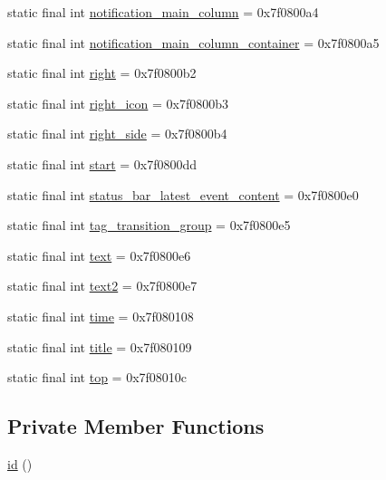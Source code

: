 \begin{DoxyCompactItemize}
static final int \mbox{\hyperlink{classcom_1_1jjoe64_1_1graphview_1_1_r_1_1id_a72bedca8ca6563404af280e15fcbd2ea}{notification\+\_\+main\+\_\+column}} = 0x7f0800a4
\item 
static final int \mbox{\hyperlink{classcom_1_1jjoe64_1_1graphview_1_1_r_1_1id_a2ddc64536454c41b6ff689ad255afba2}{notification\+\_\+main\+\_\+column\+\_\+container}} = 0x7f0800a5
\item 
static final int \mbox{\hyperlink{classcom_1_1jjoe64_1_1graphview_1_1_r_1_1id_ac7186ed882b6a05a4551a6e400df63bf}{right}} = 0x7f0800b2
\item 
static final int \mbox{\hyperlink{classcom_1_1jjoe64_1_1graphview_1_1_r_1_1id_a14e667a5473dc07007a0d3cd1a71e489}{right\+\_\+icon}} = 0x7f0800b3
\item 
static final int \mbox{\hyperlink{classcom_1_1jjoe64_1_1graphview_1_1_r_1_1id_a52539876948f10692535f7e09bb716fa}{right\+\_\+side}} = 0x7f0800b4
\item 
static final int \mbox{\hyperlink{classcom_1_1jjoe64_1_1graphview_1_1_r_1_1id_addd3ab2faa8fb412331df3854c1b5a48}{start}} = 0x7f0800dd
\item 
static final int \mbox{\hyperlink{classcom_1_1jjoe64_1_1graphview_1_1_r_1_1id_afa8af09c128eaef60865cbdb0acda5de}{status\+\_\+bar\+\_\+latest\+\_\+event\+\_\+content}} = 0x7f0800e0
\item 
static final int \mbox{\hyperlink{classcom_1_1jjoe64_1_1graphview_1_1_r_1_1id_a1c1d92f744170c742c99bbcc0a86b55d}{tag\+\_\+transition\+\_\+group}} = 0x7f0800e5
\item 
static final int \mbox{\hyperlink{classcom_1_1jjoe64_1_1graphview_1_1_r_1_1id_ac0b28fbd8db1383515911769eb114189}{text}} = 0x7f0800e6
\item 
static final int \mbox{\hyperlink{classcom_1_1jjoe64_1_1graphview_1_1_r_1_1id_a5079984fd9fb5850ad5ec7c44f83c349}{text2}} = 0x7f0800e7
\item 
static final int \mbox{\hyperlink{classcom_1_1jjoe64_1_1graphview_1_1_r_1_1id_ab68184b53bae3b235ec66224a93d5d07}{time}} = 0x7f080108
\item 
static final int \mbox{\hyperlink{classcom_1_1jjoe64_1_1graphview_1_1_r_1_1id_a17397bd8c370ede9d4f219ec013dd78e}{title}} = 0x7f080109
\item 
static final int \mbox{\hyperlink{classcom_1_1jjoe64_1_1graphview_1_1_r_1_1id_ad99b3597dff3c7e3509265fbf6333241}{top}} = 0x7f08010c
\end{DoxyCompactItemize}
\subsection*{Private Member Functions}
\begin{DoxyCompactItemize}
\item 
\mbox{\hyperlink{classcom_1_1jjoe64_1_1graphview_1_1_r_1_1id_a8f17eca8851fc4a446a195c4c056beb2}{id}} ()
\end{DoxyCompactItemize}


